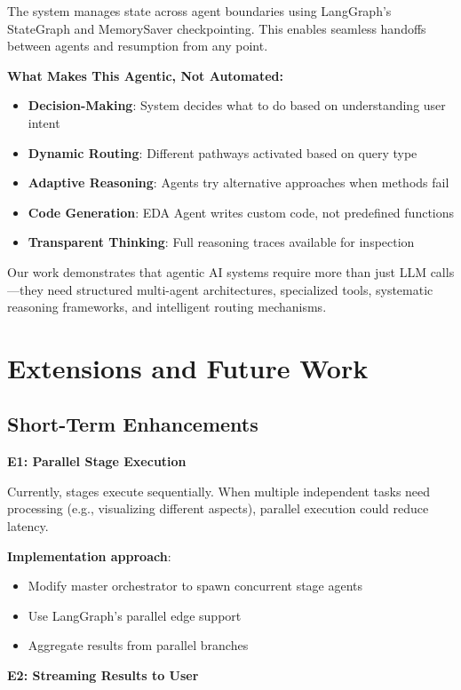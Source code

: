 \documentclass[11pt,a4paper]{article}
\begin{document}
The system manages state across agent boundaries using LangGraph's StateGraph and MemorySaver checkpointing. This enables seamless handoffs between agents and resumption from any point.

\textbf{What Makes This Agentic, Not Automated:}
\begin{itemize}
    \item \textbf{Decision-Making}: System decides what to do based on understanding user intent
    \item \textbf{Dynamic Routing}: Different pathways activated based on query type
    \item \textbf{Adaptive Reasoning}: Agents try alternative approaches when methods fail
    \item \textbf{Code Generation}: EDA Agent writes custom code, not predefined functions
    \item \textbf{Transparent Thinking}: Full reasoning traces available for inspection
\end{itemize}

Our work demonstrates that agentic AI systems require more than just LLM calls---they need structured multi-agent architectures, specialized tools, systematic reasoning frameworks, and intelligent routing mechanisms.

\section{Extensions and Future Work}

\subsection{Short-Term Enhancements}

\textbf{E1: Parallel Stage Execution}

Currently, stages execute sequentially. When multiple independent tasks need processing (e.g., visualizing different aspects), parallel execution could reduce latency.

\textbf{Implementation approach}:
\begin{itemize}
    \item Modify master orchestrator to spawn concurrent stage agents
    \item Use LangGraph's parallel edge support
    \item Aggregate results from parallel branches
\end{itemize}

\textbf{E2: Streaming Results to User}
\end{document}
